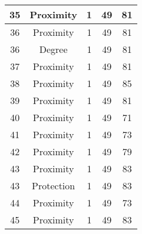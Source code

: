 \documentclass[results.tex]{subfiles}
\begin{document}
\begin{center}
\begin{tabular}{| c || c | c | c | c |}
            \hline
            35                      & Proximity                    & 1                      & 49                      & 81                   \\
            \hline
            36                      & Proximity                    & 1                      & 49                      & 81                   \\
            \hline
            36                      & Degree                       & 1                      & 49                      & 81                   \\
            \hline
            37                      & Proximity                    & 1                      & 49                      & 81                   \\
            \hline
            38                      & Proximity                    & 1                      & 49                      & 85                   \\
            \hline
            39                      & Proximity                    & 1                      & 49                      & 81                   \\
            \hline
            40                      & Proximity                    & 1                      & 49                      & 71                   \\
            \hline
            41                      & Proximity                    & 1                      & 49                      & 73                   \\
            \hline
            42                      & Proximity                    & 1                      & 49                      & 79                   \\
            \hline
            43                      & Proximity                    & 1                      & 49                      & 83                   \\
            \hline
            43                      & Protection                   & 1                      & 49                      & 83                   \\
            \hline
            44                      & Proximity                    & 1                      & 49                      & 73                   \\
            \hline
            45                      & Proximity                    & 1                      & 49                      & 83                   \\

\end{tabular}
\end{center}
\end{document}
